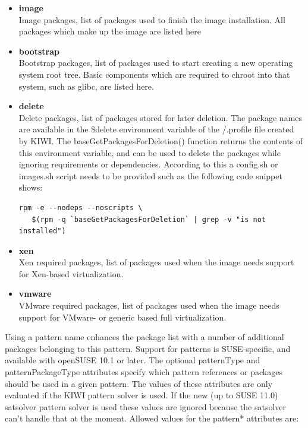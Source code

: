 \begin{itemize}
\item \textbf{image}\\
      Image packages, list of packages used to finish the image
      installation. All packages which make up the image are listed here
\item \textbf{bootstrap}\\
      Bootstrap packages, list of packages used to start creating a
      new operating system root tree. Basic components which are
      required to chroot into that system, such as glibc, are listed here.

\item \textbf{delete}\\
      Delete packages, list of packages stored for later deletion.
      The package names are available in the \$delete environment
      variable of the /.profile file created by KIWI. The 
      baseGetPackagesForDeletion() function returns the contents of this
      environment variable, and can be used to delete the packages
      while ignoring requirements or dependencies. According to this
      a config.sh or images.sh script needs to be provided such as
      the following code snippet shows:
\begin{verbatim}
rpm -e --nodeps --noscripts \
   $(rpm -q `baseGetPackagesForDeletion` | grep -v "is not installed")
\end{verbatim}
\item \textbf{xen}\\
      Xen required packages, list of packages used when the image
      needs support for Xen-based virtualization.
\item \textbf{vmware}\\
      VMware required packages, list of packages used when the image
      needs support for VMware- or generic based full virtualization.
\end{itemize}

Using a pattern name enhances the package list with a number of
additional packages belonging to this pattern. Support for patterns
is SUSE-specific, and available with openSUSE 10.1 or later.
The optional patternType and patternPackageType attributes specify
which pattern references or packages should be used in a given pattern.
The values of these attributes are only evaluated if the KIWI pattern
solver is used. If the new (up to SUSE 11.0) satsolver pattern solver
is used these values are ignored because the satsolver can't handle
that at the moment. Allowed values for the pattern* attributes are:

